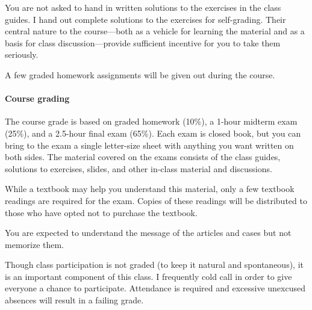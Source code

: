 \documentclass[11pt]{article}
\begin{document}
You are not asked to hand in written solutions to the exercises in the class guides. I hand out complete solutions to the exercises for self-grading. Their central nature to the course---both as a vehicle for learning the material and as a basis for class discussion---provide sufficient incentive for you to take them seriously.

A few graded homework assignments will be given out during the course.

\paragraph*{Course grading}

The course grade is based on graded homework (10\%), a 1-hour midterm exam (25\%), and a 2.5-hour final exam (65\%). Each exam is closed book, but you can bring to the exam a single letter-size sheet with anything you want written on both sides. The material covered on the exams consists of the class guides, solutions to exercises, slides, and other in-class material and discussions.

While a textbook may help you understand this material, only a few textbook readings are required for the exam. Copies of these readings will be distributed to those who have opted not to purchase the textbook.

You are expected to understand the message of the articles and cases but not memorize them.

Though class participation is not graded (to keep it natural and spontaneous), it is an important component of this class. I frequently cold call in order to give everyone a chance to participate. Attendance is required and excessive unexcused absences will result in a failing grade.
\end{document}
